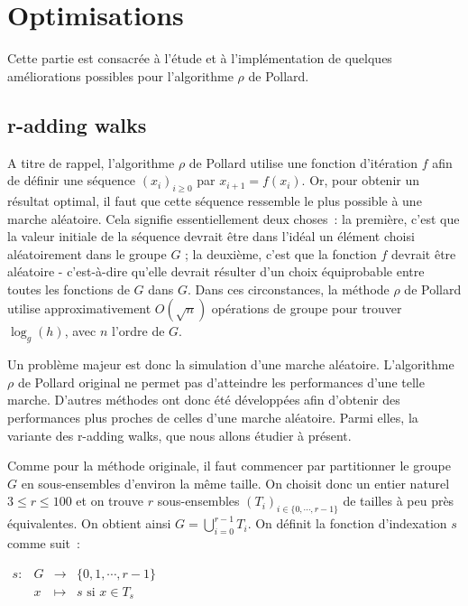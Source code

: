 \chapter{Optimisations}
	Cette partie est consacrée à l'étude et à l'implémentation de quelques améliorations possibles pour l'algorithme $\rho$ de Pollard.
		
		\section{r-adding walks}
		A titre de rappel, l'algorithme $\rho$ de Pollard utilise une fonction d'itération $f$ afin de définir une séquence $(x_i)_{i \ge 0}$ par $x_{i+1} = f(x_i)$. Or, pour obtenir un résultat optimal, il faut que cette séquence ressemble le plus possible à une marche aléatoire. Cela signifie essentiellement deux choses~: la première, c'est que la valeur initiale de la séquence devrait être dans l'idéal un élément choisi aléatoirement dans le groupe $G$ ; la deuxième, c'est que la fonction $f$ devrait être aléatoire - c'est-à-dire qu'elle devrait résulter d'un choix équiprobable entre toutes les fonctions de $G$ dans $G$. Dans ces circonstances, la méthode $\rho$ de Pollard utilise approximativement $O(\sqrt{n})$ opérations de groupe pour trouver $\log_g(h)$, avec $n$ l'ordre de $G$.
		
		Un problème majeur est donc la simulation d'une marche aléatoire. L'algorithme $\rho$ de Pollard original ne permet pas d'atteindre les performances d'une telle marche. D'autres méthodes ont donc été développées afin d'obtenir des performances plus proches de celles d'une marche aléatoire. Parmi elles, la variante des r-adding walks, que nous allons étudier à présent.
		
		Comme pour la méthode originale, il faut commencer par partitionner le groupe $G$ en sous-ensembles d'environ la même taille. On choisit donc un entier naturel $3 \leq r \leq 100$ et on trouve $r$ sous-ensembles $(T_i)_{i \in \{0,\cdots,r-1\}}$ de tailles à peu près équivalentes. On obtient ainsi $G = \bigcup\limits_{i=0}^{r-1} T_i$. On définit la fonction d'indexation $s$ comme suit~:
		
		\begin{center}
		
		$\begin{array}{lrcl}
		s : & G & \longrightarrow & \{0,1,\cdots,r-1\} \\
		    & x & \longmapsto & s \text{ si } x \in T_s
		\end{array}$
		
		\end{center}
		
